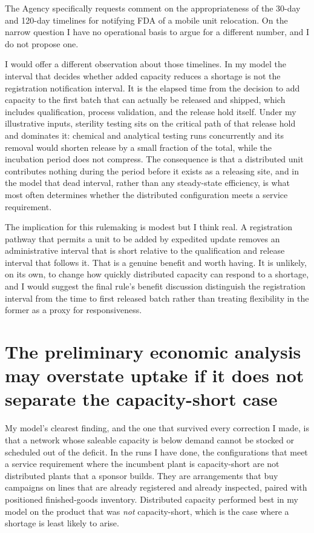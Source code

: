 \documentclass[11pt,letterpaper]{article}
\begin{document}
The Agency specifically requests comment on the appropriateness of the 30-day and 120-day timelines
for notifying FDA of a mobile unit relocation. On the narrow question I have no operational basis to
argue for a different number, and I do not propose one.

I would offer a different observation about those timelines. In my model the interval that decides
whether added capacity reduces a shortage is not the registration notification interval. It is the
elapsed time from the decision to add capacity to the first batch that can actually be released and
shipped, which includes qualification, process validation, and the release hold itself. Under my
illustrative inputs, sterility testing sits on the critical path of that release hold and dominates
it: chemical and analytical testing runs concurrently and its removal would shorten release by a
small fraction of the total, while the incubation period does not compress. The consequence is that
a distributed unit contributes nothing during the period before it exists as a releasing site, and
in the model that dead interval, rather than any steady-state efficiency, is what most often
determines whether the distributed configuration meets a service requirement.

The implication for this rulemaking is modest but I think real. A registration pathway that permits
a unit to be added by expedited update removes an administrative interval that is short relative to
the qualification and release interval that follows it. That is a genuine benefit and worth having.
It is unlikely, on its own, to change how quickly distributed capacity can respond to a shortage,
and I would suggest the final rule's benefit discussion distinguish the registration interval from
the time to first released batch rather than treating flexibility in the former as a proxy for
responsiveness.

\section{The preliminary economic analysis may overstate uptake if it does not separate the
capacity-short case}

My model's clearest finding, and the one that survived every correction I made, is that a network
whose saleable capacity is below demand cannot be stocked or scheduled out of the deficit. In the
runs I have done, the configurations that meet a service requirement where the incumbent plant is
capacity-short are not distributed plants that a sponsor builds. They are arrangements that buy
campaigns on lines that are already registered and already inspected, paired with positioned
finished-goods inventory. Distributed capacity performed best in my model on the product that was
\emph{not} capacity-short, which is the case where a shortage is least likely to arise.
\end{document}
